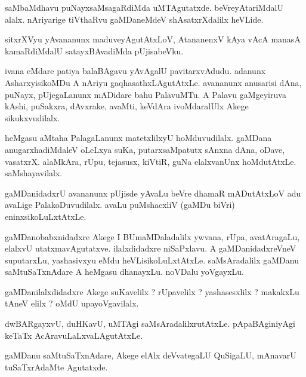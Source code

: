\documentclass{article}
\begin{document}
\begin{mn}
saMbaMdhavu  puNayxsaMsagaRdiMda  uMTAgutatxde.  beVreyAtariMdalU alalx.  
nAriyarige tiVthaRvu gaMDaneMdeV shAsatxrXdalilx heVLide.
\end{mn}

\begin{mn}
sitxrXVyu yAvananunx maduveyAgutAtxLoV, AtananenxV kAya vAcA manasA kamaRdiMdalU satayxBAvadiMda pUjisabeVku.
\end{mn}

\begin{mn}
ivana eMdare patiya balaBAgavu yAvAgalU pavitarxvAdudu.  adanunx AsharxyisikoMDu 
A  nAriyu gaqhasathxLAgutAtxLe.  avananunx anusarisi dAna, puNayx, pUjegaLanunx 
mADidare bahu PalavuMTu. A Palavu gaMgeyiruva kAshi, puSakxra,  dAvxrake, 
avaMti,  keVdAra ivoMdaralUlx Akege sikukxvudilalx.
\end{mn}

\begin{mn}
heMgasu aMtaha PalagaLanunx matetxlilxyU  hoMduvudilalx. gaMDana anugarxhadiMdaleV  
oLeLxya suKa, putarxsaMpatutx sAnxna dAna, oDave, vasatxrX. alaMkAra, 
rUpu, tejasusx, kiVtiR, guNa elalxvanUnx  hoMdutAtxLe. saMshayavilalx.
\end{mn}

\begin{mn}
gaMDanidadxrU avananunx  pUjisde  yAvaLu  beVre dhamaR mADutAtxLoV adu avaLige 
PalakoDuvudilalx.  avaLu puMshacxliV (gaMDu biVri) eninxsikoLuLxtAtxLe.
\end{mn}

\begin{mn}
gaMDanobabxnidadxre Akege I BUmaMDaladalilx  ywvana, rUpa, avatAragaLu,  
elalxvU utatxmavAgutatxve.  ilalxdidadxre  niSaPxlavu.  A gaMDanidadxreVneV 
suputarxLu,  yashasivxyu eMdu heVLisikoLuLxtAtxLe.  saMsAradalilx gaMDanu  
saMtuSaTxnAdare A  heMgasu  dhanayxLu.  noVDalu yoVgayxLu.
\end{mn}

\begin{mn}
gaMDanilalxdidadxre Akege suKavelilx ?  rUpavelilx ?  yashasesxlilx ?  
makakxLu tAneV elilx ?  oMdU upayoVgavilalx. 
\end{mn}


\begin{mn}
dwBARgayxvU,  duHKavU,  uMTAgi  saMsAradalilxrutAtxLe.  pApaBAginiyAgi  keTaTx AcAravuLaLxvaLAgutAtxLe.
\end{mn}

\begin{mn}
gaMDanu saMtuSaTxnAdare,  Akege elAlx deVvategaLU  QuSigaLU,  mAnavarU  tuSaTxrAdaMte  Agutatxde.
\end{mn}
\end{document}
